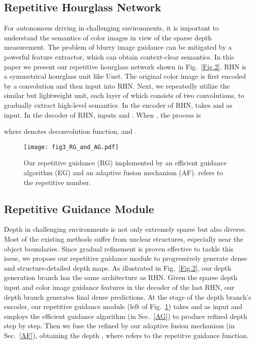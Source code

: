 \documentclass[runningheads]{llncs}
\begin{document}
\subsection{Repetitive Hourglass Network}\label{RHN}
For autonomous driving in challenging environments, it is important to understand the semantics of color images in view of the sparse depth measurement. The problem of blurry image guidance can be mitigated by a powerful feature extractor, which can obtain context-clear semantics. In this paper we present our repetitive hourglass network shown in Fig.~\ref{Fig.2}. RHN is a symmetrical hourglass unit like Unet. The original color image is first encoded by a  convolution and then input into RHN. Next, we repeatedly utilize the similar but lightweight unit, each layer of which consists of two convolutions, to gradually extract high-level semantics. In the encoder of RHN,  takes  and  as input. In the decoder of RHN,  inputs  and . When , the process is


where  denotes deconvolution function, and .


\begin{figure}[t]
  \centering
  \texttt{[image: fig3\_RG\_and\_AG.pdf]}\\
  \caption{Our repetitive guidance (RG) implemented by an efficient guidance algorithm (EG) and an adaptive fusion mechanism (AF).  refers to the repetitive number.}\label{Fig.3}
\end{figure}


\subsection{Repetitive Guidance Module}\label{RG}
Depth in challenging environments is not only extremely sparse but also diverse. Most of the existing methods suffer from unclear structures, especially near the object boundaries. Since gradual refinement is proven effective \cite{Cheng2020CSPN,park2020nonlocal,xu2020deformable} to tackle this issue, we propose our repetitive guidance module to progressively generate dense and structure-detailed depth maps. As illustrated in Fig.~\ref{Fig.2}, our depth generation branch has the same architecture as RHN. Given the sparse depth input and color image guidance features  in the decoder of the last RHN, our depth branch generates final dense predictions. At the stage of the depth branch's encoder, our repetitive guidance module (left of Fig.~\ref{Fig.3}) takes  and  as input and employs the efficient guidance algorithm (in Sec.~\ref{AG}) to produce refined depth  step by step. Then we fuse the refined  by our adaptive fusion mechanism (in Sec.~\ref{AF}), obtaining the depth , 
where  refers to the repetitve guidance function.
\vspace{-15pt}
\end{document}
